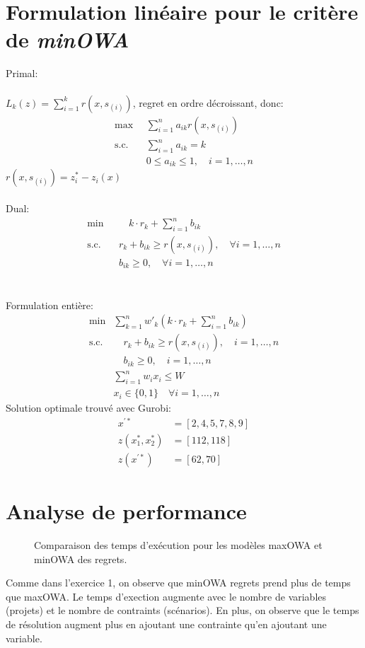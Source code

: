 \documentclass[10pt,a4paper]{report}
\begin{document}
\section{Formulation linéaire pour le critère de \textit{minOWA}}
Primal:\\\\
$L_k(z)=\sum_{i=1}^{k} r(x,s_{(i)})$, regret en ordre décroissant, donc:\\
\begin{align*}
    \max &\sum_{i=1}^n a_{ik} r(x,s_{(i)})\\
\text{s.c.} \quad & \sum_{i=1}^{n} a_{ik} = k \\
& 0 \leq a_{ik} \leq 1, \quad i = 1, \dots, n
\end{align*}
$r(x,s_{(i)}) = z_i^*-z_i(x)$\\\\
Dual:
\begin{align*}
\min & \quad k \cdot r_k + \sum_{i=1}^{n} b_{ik} \\
\text{s.c.} \quad & r_k + b_{ik} \geq r(x,s_{(i)}), \quad \forall i = 1, \dots, n \\
& b_{ik} \geq 0, \quad \forall i = 1, \dots, n
\end{align*}\\\\
Formulation entière:
\begin{align*}
\min &\sum_{k=1}^n w'_k \left( k \cdot r_k + \sum_{i=1}^n b_{ik} \right) \\
\text{s.c.} & \quad r_k + b_{ik} \geq r(x,s_{(i)}), \quad i = 1, \dots, n \\
& \quad b_{ik} \geq 0, \quad i = 1, \dots, n \\
& \sum_{i=1}^{n} w_i x_i \leq W\\
&x_i\in\{0,1\}\quad \forall i=1, \dots,n
\end{align*}
Solution optimale trouvé avec Gurobi:
\begin{align*}
	x^{'*} 	&= [2, 4, 5, 7, 8, 9]\\
	z(x_1^*,x_2^*) &= [112,118]\\ 
	z(x^{'*}) 	&= [62,70]
\end{align*}
\section{Analyse de performance}
\begin{figure}[h!]
    \centering
      
    \caption{Comparaison des temps d'exécution pour les modèles maxOWA et minOWA des regrets.}
    \label{fig:performance_ex2}
\end{figure}
Comme dans l'exercice 1, on observe que minOWA regrets prend plus de temps que maxOWA. Le temps d'exection augmente avec le nombre de variables (projets) et le nombre de contraints (scénarios). En plus, on observe que le temps de résolution augment plus en ajoutant une contrainte qu'en ajoutant une variable. 
\end{document}
